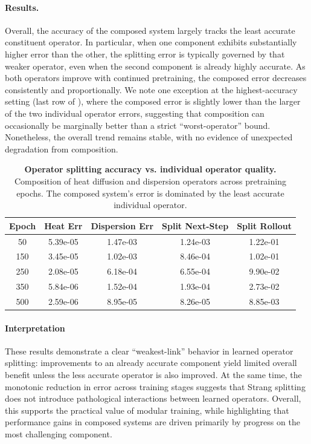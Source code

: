\documentclass{article}
\theoremstyle{plain}
\theoremstyle{definition}
\theoremstyle{remark}
\begin{document}
\paragraph{Results.}
Overall, the accuracy of the composed system largely tracks the least accurate constituent operator. In particular, when one component exhibits substantially higher error than the other, the splitting error is typically governed by that weaker operator, even when the second component is already highly accurate. As both operators improve with continued pretraining, the composed error decreases consistently and proportionally. We note one exception at the highest-accuracy setting (last row of ), where the composed error is slightly lower than the larger of the two individual operator errors, suggesting that composition can occasionally be marginally better than a strict ``worst-operator'' bound. Nonetheless, the overall trend remains stable, with no evidence of unexpected degradation from composition.




\begin{table}[t]
\centering
\caption{
\textbf{Operator splitting accuracy vs. individual operator quality.}
Composition of heat diffusion and dispersion operators across pretraining epochs. The composed system's error is dominated by the least accurate individual operator.
}
\label{tab:splitting_accuracy}
\setlength{\tabcolsep}{5pt} %
\small %
\begin{tabular}{@{}ccccc@{}}
\toprule
\textbf{Epoch} & \textbf{Heat Err} & \textbf{Dispersion Err} & \textbf{Split Next-Step} & \textbf{Split Rollout} \\
\midrule
50 & 5.39e-05 & 1.47e-03 & 1.24e-03 & 1.22e-01 \\
150 & 3.45e-05 & 1.02e-03 & 8.46e-04 & 1.02e-01 \\
250 & 2.08e-05 & 6.18e-04 & 6.55e-04 & 9.90e-02 \\
350 & 5.84e-06 & 1.52e-04 & 1.93e-04 & 2.73e-02 \\
500 & 2.59e-06 & 8.95e-05 & 8.26e-05 & 8.85e-03 \\
\bottomrule
\end{tabular}
\end{table}

\paragraph{Interpretation}
These results demonstrate a clear ``weakest-link'' behavior in learned operator splitting: improvements to an already accurate component yield limited overall benefit unless the less accurate operator is also improved. At the same time, the monotonic reduction in error across training stages suggests that Strang splitting does not introduce pathological interactions between learned operators. Overall, this supports the practical value of modular training, while highlighting that performance gains in composed systems are driven primarily by progress on the most challenging component.
\end{document}
